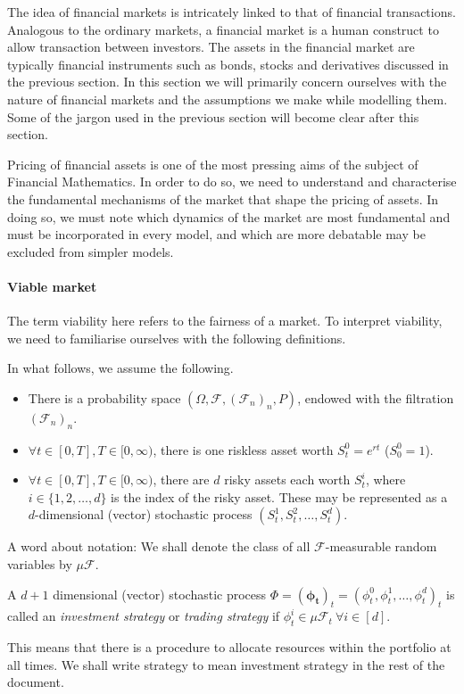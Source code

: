 The idea of financial markets is intricately linked to that of financial transactions. Analogous to the ordinary markets, a financial market is a human construct to allow transaction between investors. The assets in the financial market are typically financial instruments such as bonds, stocks and derivatives discussed in the previous section. In this section we will primarily concern ourselves with the nature of financial markets and the assumptions we make while modelling them. Some of the jargon used in the previous section will become clear after this section.

Pricing of financial assets is one of the most pressing aims of the subject of Financial Mathematics. In order to do so, we need to understand and characterise the fundamental mechanisms of the market that shape the pricing of assets. In doing so, we must note which dynamics of the market are most fundamental and must be incorporated in every model, and which are more debatable may be excluded from simpler models.

\paragraph{Viable market}
The term viability here refers to the fairness of a market. To interpret viability, we need to familiarise ourselves with the following definitions.

In what follows, we assume the following.
\begin{itemize}
	\item There is a probability space $ (\Omega, \mathcal{F}, (\mathcal{F}_n)_n, P) $, endowed with the filtration $ (\mathcal{F}_n)_n $.
	\item $ \forall t \in [0, T], T \in [0, \infty) $, there is one riskless asset worth $ S_t^0 = e^{rt} $ ($ S_0^0 = 1 $).
	\item $ \forall t \in [0, T], T \in [0, \infty) $, there are $ d $ risky assets each worth $ S_t^i $, where $ i \in \{ 1, 2, \dots, d \} $ is the index of the risky asset. These may be represented as a $ d $-dimensional (vector) stochastic process $ ( S_t^1, S_t^2, \dots, S_t^d ) $.
\end{itemize}

A word about notation: We shall denote the class of all $ \mathcal{F} $-measurable random variables by $ \mu \mathcal{F} $.

\begin{dfn}
	A $ d + 1 $ dimensional (vector) stochastic process $ \Phi = (\bm{\phi_t})_t = (\phi_t^0, \phi_t^1, \dots, \phi_t^d)_t $ is called an \emph{investment strategy} or \emph{trading strategy} if $ \phi_t^i \in \mu \mathcal{F}_t \  \forall i \in [d]$.
\end{dfn}
This means that there is a procedure to allocate resources within the portfolio at all times. We shall write strategy to mean investment strategy in the rest of the document.

